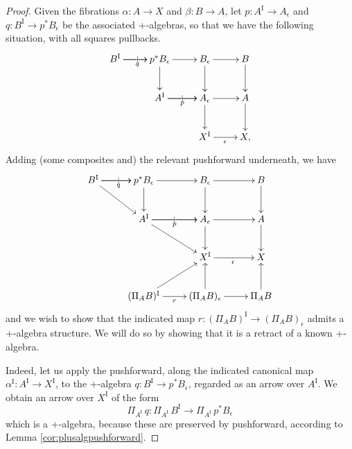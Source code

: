 \documentclass[12pt]{article}
\makeatletter
\newcommand{\pbcorner}[1][dr]{\save*!/#1-1.2pc/#1:(-1,1)@^{|-}\restore}
\newcommand{\ra}{\ensuremath{\rightarrow}}
\newcommand{\I}{\ensuremath{\mathrm{I}}}
\theoremstyle{remark}
\theoremstyle{definition}
\makeatother
\begin{document}
\begin{proof}
Given the fibrations $\alpha : A \ra X$ and $\beta: B\ra A$, let $p : A^\I \ra A_\epsilon$ and $q : B^\I \ra p^*B_\epsilon$ be the associated +-algebras, so that we have the following situation, with all squares pullbacks.
\begin{equation}\label{diagram:frobenius1}
\xymatrix{
B^\I \ar[r]|| \ar[r]_{q}   & p^*B_\epsilon \ar[r]  \ar[d]  & B_{\epsilon}  \ar[d]   \ar[r] & B \ar[d]\\
&A^\I \ar[r]|| \ar[r]_{p}  & A_{\epsilon} \ar[d]   \ar[r] & A \ar[d]\\
&& X^\I \ar[r]_{\epsilon} &  X,
}
\end{equation}
Adding (some composites and) the relevant pushforward underneath, we have
 \begin{equation}\label{diagram:frobenius2}
\xymatrix{
B^\I \ar[r]|| \ar[r]_{q} \ar[rd]  & p^*B_\epsilon \ar[r]  \ar[d]  & B_{\epsilon}  \ar[d]   \ar[r] & B \ar[d] \\
& A^\I \ar[r]|| \ar[r]_{p} \ar[rd]  & A_{\epsilon} \ar[d]   \ar[r] & A \ar[d] \\
&& X^\I \ar[r]_{\epsilon} &  X \\
& (\Pi_AB)^\I  \ar[r]_r  \ar[ru] & (\Pi_AB)_\epsilon  \ar[u] \ar[r] & \Pi_AB \ar[u]
}
\end{equation}
and we wish to show that the indicated  map $r : (\Pi_AB)^\I \ra (\Pi_AB)_\epsilon$
 admits a +-algebra structure. We will do so by showing that it is a retract of a known +-algebra.

Indeed, let us apply the pushforward, along the indicated canonical map $\alpha^\I:A^\I \ra X^\I$, to the +-algebra $q : B^\I \ra p^*B_\epsilon$, regarded as an arrow over $A^\I$.  We obtain an arrow over $X^\I$ of the form
\[
\Pi_{A^\I}\,q :  \Pi_{A^\I}\,B^\I \ra \Pi_{A^\I}\,p^*B_\epsilon
\]
which is a +-algebra, because these are preserved by pushforward, according to Lemma \ref{cor:plusalgpushforward}.


\end{proof}
\end{document}

